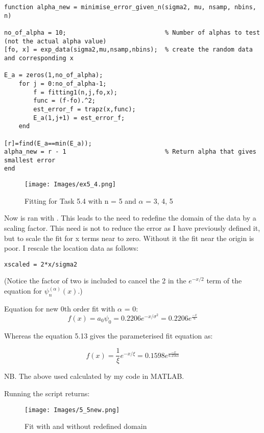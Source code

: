 \documentclass{article}
\begin{document}
\begin{lstlisting}
function alpha_new = minimise_error_given_n(sigma2, mu, nsamp, nbins, n)

no_of_alpha = 10;                           % Number of alphas to test (not the actual alpha value)
[fo, x] = exp_data(sigma2,mu,nsamp,nbins);  % create the random data and corresponding x

E_a = zeros(1,no_of_alpha);
    for j = 0:no_of_alpha-1;
        f = fitting1(n,j,fo,x);
        func = (f-fo).^2;
        est_error_f = trapz(x,func);
        E_a(1,j+1) = est_error_f;
    end
   
[r]=find(E_a==min(E_a));
alpha_new = r - 1                           % Return alpha that gives smallest error
end
\end{lstlisting}

\begin{figure}[h]
\texttt{[image: Images/ex5\_4.png]}
\caption{Fitting for Task 5.4 with n = 5 and $\alpha$ = 3, 4, 5}
\hfill
\end{figure}


Now  is ran with . This leads to the need to redefine the domain of the data by a scaling factor. This need is not to reduce the error as I have previously defined it, but to scale the fit for x terms near to zero. Without it the fit near the origin is poor. I rescale the location data as follows: 
 
\begin{lstlisting}
xscaled = 2*x/sigma2
\end{lstlisting}

(Notice the factor of two is included to cancel the 2 in the $e^{-x/2}$ term of the equation for $\psi_n^{( \alpha)}(x)$.)



Equation for new 0th order fit with $ \alpha$ = 0:
$$ f(x) = a_0 \psi_0 = 0.2206e^{-x/ \sigma^{2}} = 0.2206e^{\frac{-x}{6}}$$

Whereas the equation 5.13 gives the parameterised fit equation as:

$$ f(x) = \frac{1}{\xi}e^{-x/ \xi} = 0.1598e^{ \frac{-x}{6.2563}}$$

NB. The above used  calculated by my code in MATLAB.

Running the script  returns:


\begin{figure}[h]
\texttt{[image: Images/5\_5new.png]}
\caption{Fit with and without redefined domain}
\hfill
\end{figure}
\end{document}

